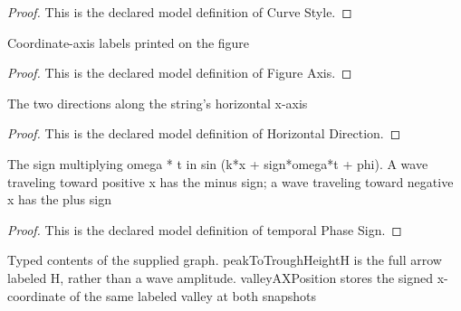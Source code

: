 \begin{proof}
  This is the declared model definition of Curve Style.
\end{proof}
\begin{definition}
  \label{def:physics:phyx-mini-0294:phyxminiproblems-problemphyxmini0294-figureaxis}
  Coordinate-axis labels printed on the figure
\end{definition}
\begin{proof}
  This is the declared model definition of Figure Axis.
\end{proof}
\begin{definition}
  \label{def:physics:phyx-mini-0294:phyxminiproblems-problemphyxmini0294-horizontaldirection}
  The two directions along the string's horizontal x-axis
\end{definition}
\begin{proof}
  This is the declared model definition of Horizontal Direction.
\end{proof}
\begin{definition}
  \label{def:physics:phyx-mini-0294:phyxminiproblems-problemphyxmini0294-temporalphasesign}
  The sign multiplying omega * t in sin (k*x + sign*omega*t + phi). A wave traveling toward positive x has the minus sign; a wave traveling toward negative x has the plus sign
\end{definition}
\begin{proof}
  This is the declared model definition of temporal Phase Sign.
\end{proof}
\begin{definition}
  \label{def:physics:phyx-mini-0294:phyxminiproblems-problemphyxmini0294-resultantwavefigure}
  Typed contents of the supplied graph. peakToTroughHeightH is the full arrow labeled H, rather than a wave amplitude. valleyAXPosition stores the signed x-coordinate of the same labeled valley at both snapshots
\end{definition}
